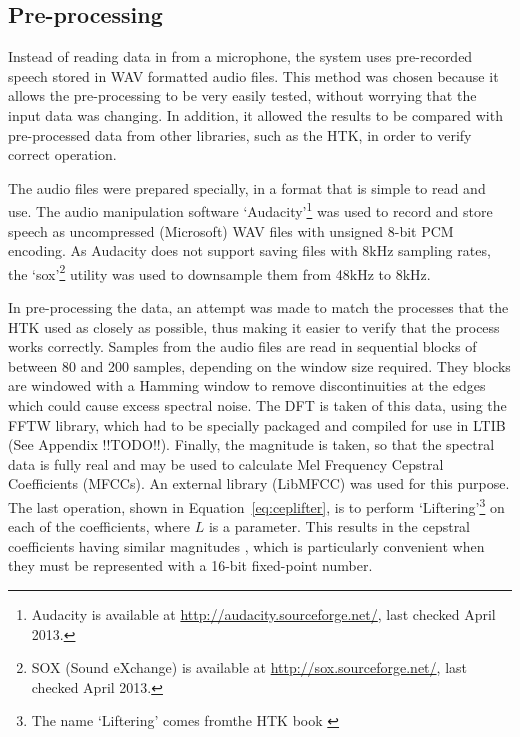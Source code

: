 
	\subsection{Pre-processing} %
	\label{sub:pre_processing}
		Instead of reading data in from a microphone, the system uses pre-recorded speech stored in WAV formatted audio files.  This method was chosen because it allows the pre-processing to be very easily tested, without worrying that the input data was changing.  In addition, it allowed the results to be compared with pre-processed data from other libraries, such as the HTK, in order to verify correct operation.

		The audio files were prepared specially, in a format that is simple to read and use.  The audio manipulation software `Audacity'\footnote{Audacity is available at \href{http://audacity.sourceforge.net/}{http://audacity.sourceforge.net/}, last checked April 2013.} was used to record and store speech as uncompressed (Microsoft) WAV files with unsigned 8-bit PCM encoding.  As Audacity does not support saving files with 8kHz sampling rates, the `sox'\footnote{SOX (Sound eXchange) is available at \href{http://sox.sourceforge.net/}{http://sox.sourceforge.net/}, last checked April 2013.} utility was used to downsample them from 48kHz to 8kHz.

		In pre-processing the data, an attempt was made to match the processes that the HTK used as closely as possible, thus making it easier to verify that the process works correctly.  Samples from the audio files are read in sequential blocks of between 80 and 200 samples, depending on the window size required.  They blocks are windowed with a Hamming window to remove discontinuities at the edges which could cause excess spectral noise.  The DFT is taken of this data, using the FFTW library, which had to be specially packaged and compiled for use in LTIB (See Appendix !!TODO!!).  Finally, the magnitude is taken, so that the spectral data is fully real and may be used to calculate Mel Frequency Cepstral Coefficients (MFCCs).  An external library (LibMFCC) was used for this purpose.  The last operation, shown in Equation~\ref{eq:ceplifter}, is to perform `Liftering'\footnote{The name `Liftering' comes fromthe HTK book \cite{htkbook}} on each of the coefficients, where $L$ is a parameter.  This results in the cepstral coefficients having similar magnitudes \cite{htkbook}, which is particularly convenient when they must be represented with a 16-bit fixed-point number.

